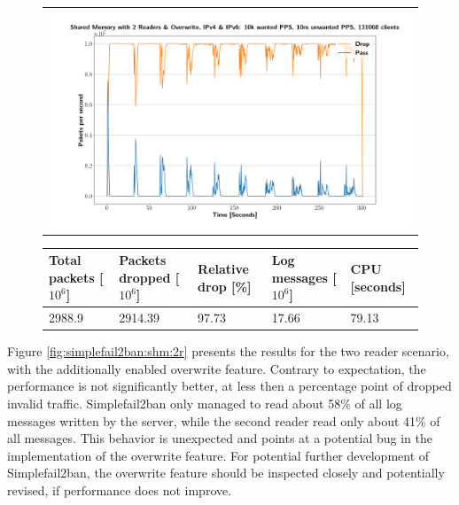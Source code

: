 \pagebreak

\begin{figure}[!h]
	\centering
	\scriptsize
	\begin{tabular}{c}
    	\centerline{\includegraphics[width=1.2\textwidth]{images/simplefail2ban_shm_2r_or_ipv46_v10k_iv10m_c131068.png}}
	\end{tabular}
	\begin{tabular}{lllll}
		\toprule
		\textbf{Total packets [$10^6$]} & \textbf{Packets dropped [$10^6$]} & \textbf{Relative drop [\%]} & \textbf{Log messages [$10^6$]} & \textbf{CPU [seconds]} \\ \midrule 
		2988.9 & 2914.39 & 97.73 & 17.66 & 79.13 \\
		\bottomrule
	\end{tabular}
	\caption[Simplefail2ban, Shared Memory 2 Readers with Overwrite]{}
	\label{fig:simplefail2ban:shm:or}
\end{figure}

Figure \ref{fig:simplefail2ban:shm:2r} presents the results for the two reader scenario, with the additionally enabled overwrite feature. Contrary to expectation,
the performance is not significantly better, at less then a percentage point of dropped invalid traffic. Simplefail2ban only managed to read about 58\% of all log messages 
written by the server, while the second reader read only about 41\% of all messages. This behavior is unexpected and points at a potential bug in the implementation of the overwrite
feature. For potential further development of Simplefail2ban, the overwrite feature should be inspected closely and potentially revised, if performance does not improve. 

\pagebreak

